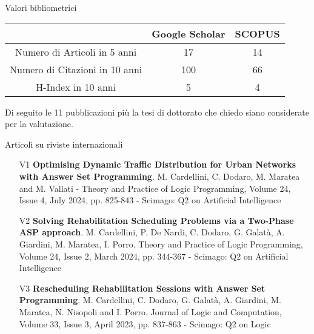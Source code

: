 \documentclass{resume} %
\begin{document}
\begin{rSection}{Valori bibliometrici}
\begin{center}
	
\begin{tabular}{ccc}

 & Google Scholar & SCOPUS \\ \hline
\multicolumn{1}{c}{Numero di Articoli in 5 anni} & 17 & 14 \\ \hline
\multicolumn{1}{c}{Numero di Citazioni in 10 anni} & 100 & 66 \\ \hline
\multicolumn{1}{c}{H-Index in 10 anni} & 5 & 4 \\ 
\end{tabular}%
\end{center}
\end{rSection}

\pagebreak
Di seguito le 11 pubblicazioni più la tesi di dottorato che chiedo siano considerate per la valutazione.

\begin{rSection}{Articoli su riviste internazionali}
\begin{enumerate}[leftmargin=5mm]
	\item[V1] \textbf{Optimising Dynamic Traffic Distribution for Urban Networks with Answer Set Programming}. M. Cardellini, C. Dodaro, M. Maratea and M. Vallati - Theory and Practice of Logic Programming,  Volume 24, Issue 4, July 2024, pp. 825-843 - Scimago: Q2 on Artificial Intelligence
	\item[V2] \textbf{Solving Rehabilitation Scheduling Problems via a Two-Phase ASP approach}. M. Cardellini, P. De Nardi, C. Dodaro, G. Galat\`a, A. Giardini, M. Maratea, I. Porro. Theory and Practice of Logic Programming, Volume 24, Issue 2, March 2024, pp. 344-367 - Scimago: Q2 on Artificial Intelligence
	\item[V3] \textbf{Rescheduling Rehabilitation Sessions with Answer Set Programming}. M. Cardellini, C. Dodaro, G. Galat\`a, A. Giardini, M. Maratea, N. Nisopoli and I. Porro. Journal of Logic and Computation, Volume 33, Issue 3, April 2023, pp. 837-863 - Scimago: Q2 on Logic
\end{enumerate}
\end{rSection}
 
\end{document}
